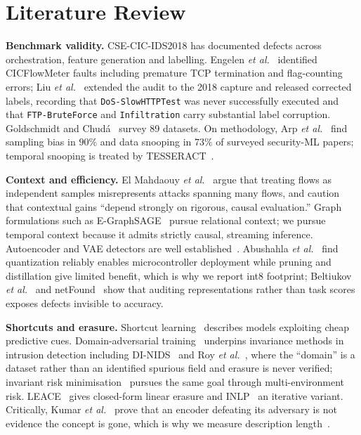 \documentclass[conference]{IEEEtran}
\begin{document}
\section{Literature Review}
\textbf{Benchmark validity.} CSE-CIC-IDS2018 has documented defects across orchestration,
feature generation and labelling. Engelen \emph{et al.}~\cite{engelen2021troubleshooting}
identified CICFlowMeter faults including premature TCP termination and flag-counting errors;
Liu \emph{et al.}~\cite{liu2022error} extended the audit to the 2018 capture and released
corrected labels, recording that \texttt{DoS-SlowHTTPTest} was never successfully executed
and that \texttt{FTP-BruteForce} and \texttt{Infiltration} carry substantial label
corruption. Goldschmidt and Chud\'a~\cite{goldschmidt2025datasets} survey 89 datasets.
On methodology, Arp \emph{et al.}~\cite{arp2022dos} find sampling bias in $90\%$ and data
snooping in $73\%$ of surveyed security-ML papers; temporal snooping is treated by
TESSERACT~\cite{pendlebury2019tesseract}.

\textbf{Context and efficiency.} El Mahdaouy \emph{et
al.}~\cite{elmahdaouy2026contextualized} argue that treating flows as independent samples
misrepresents attacks spanning many flows, and caution that contextual gains ``depend
strongly on rigorous, causal evaluation.'' Graph formulations such as
E-GraphSAGE~\cite{lo2022egraphsage} pursue relational context; we pursue temporal context
because it admits strictly causal, streaming inference. Autoencoder and VAE detectors are
well established~\cite{zavrak2020vae,kingma2014vae}. Abushahla \emph{et
al.}~\cite{abushahla2025quantization} find quantization reliably enables microcontroller
deployment while pruning and distillation give limited benefit, which is why we report int8
footprint; Beltiukov \emph{et al.}~\cite{beltiukov2025demystifying} and
netFound~\cite{guthula2024netfound} show that auditing representations rather than task
scores exposes defects invisible to accuracy.

\textbf{Shortcuts and erasure.} Shortcut learning~\cite{geirhos2020shortcut} describes
models exploiting cheap predictive cues. Domain-adversarial training~\cite{ganin2016dann}
underpins invariance methods in intrusion detection including
DI-NIDS~\cite{layeghy2022dinids} and Roy \emph{et al.}~\cite{roy2023domaininvariant}, where
the ``domain'' is a dataset rather than an identified spurious field and erasure is never
verified; invariant risk minimisation~\cite{arjovsky2019irm} pursues the same goal through
multi-environment risk. LEACE~\cite{belrose2023leace} gives closed-form linear erasure and
INLP~\cite{ravfogel2020inlp} an iterative variant. Critically, Kumar \emph{et
al.}~\cite{kumar2022probing} prove that an encoder defeating its adversary is not evidence
the concept is gone, which is why we measure description length~\cite{voita2020mdl}.
\end{document}
